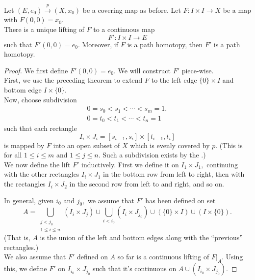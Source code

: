 \documentclass[12pt]{article}
\begin{document}
\begin{thm}
	Let $(E, e_0) \overset{p}{\longrightarrow} (X, x_0)$ be a covering map as before. Let $F:I \times I \to X$ be a map with $F(0, 0) = x_0.$\\
	There is a unique lifting of $F$ to a continuous map
	\begin{equation*} 
		F':I \times I \to E
	\end{equation*}
	such that $F'(0, 0) = e_0.$ Moreover, if $F$ is a path homotopy, then $F'$ is a path homotopy.
\end{thm} 
\begin{proof} 
	We first define $F'(0, 0) = e_0.$ We will construct $F'$ piece-wise.\\
	First, we use the preceding theorem to extend $F$ to the left edge $\{0\} \times I$ and bottom edge $I \times \{0\}.$ \\
	Now, choose subdivision
	\begin{align*} 
		0 = s_0 < s_1 < \cdots < s_m = 1,\\
		0 = t_0 < t_1 < \cdots < t_n = 1
	\end{align*}
	such that each rectangle 
	\begin{equation*} 
		I_i \times J_i = [s_{i - 1}, s_i] \times [t_{i - 1}, t_i] 
	\end{equation*}
	is mapped by $F$ into an open subset of $X$ which is evenly covered by $p.$ (This is for all $1 \le i \le m$ and $1 \le j \le n.$ Such a subdivision exists by the .)\\
	We now define the lift $F'$ inductively. First we define it on $I_1 \times J_1,$ continuing with the other rectangles $I_i \times J_1$ in the bottom row from left to right, then with the rectangles $I_i \times J_2$ in the second row from left to and right, and so on.

	In general, given $i_0$ and $j_0,$ we assume that $F'$ has been defined on set
	\begin{equation*} 
		A = \bigcup_{\substack{j < j_0\\1 \le i \le n}}(I_i \times J_j) \cup \bigcup_{i < i_0}(I_i \times J_{j_0}) \cup \left(\{0\} \times I\right) \cup \left(I \times \{0\}\right).
	\end{equation*}
	(That is, $A$ is the union of the left and bottom edges along with the ``previous'' rectangles.)\\
	We also assume that $F'$ defined on $A$ so far is a continuous lifting of $F|_A.$ Using this, we define $F'$ on $I_{i_0} \times J_{j_0}$ such that it's continuous on $A \cup (I_{i_0} \times J_{j_0}).$


\end{proof}
\end{document}
